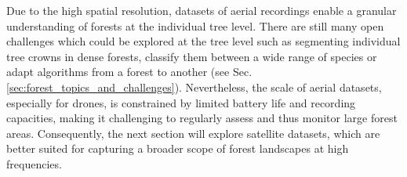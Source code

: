 \documentclass{CUP-JNL-DTM}%
\theoremstyle{definition}
\numberwithin{equation}{section}
\begin{document}
Due to the high spatial resolution, datasets of aerial recordings enable a granular understanding of forests at the individual tree level.
There are still many open challenges which could be explored at the tree level such as segmenting individual tree crowns in dense forests, classify them between a wide range of species or adapt algorithms from a forest to another (see Sec. \ref{sec:forest_topics_and_challenges}). 
Nevertheless, the scale of aerial datasets, especially for drones, is constrained by limited battery life and recording capacities, making it challenging to regularly assess and thus monitor large forest areas. 
Consequently, the next section will explore satellite datasets, which are better suited for capturing a broader scope of forest landscapes at high frequencies.
\end{document}
